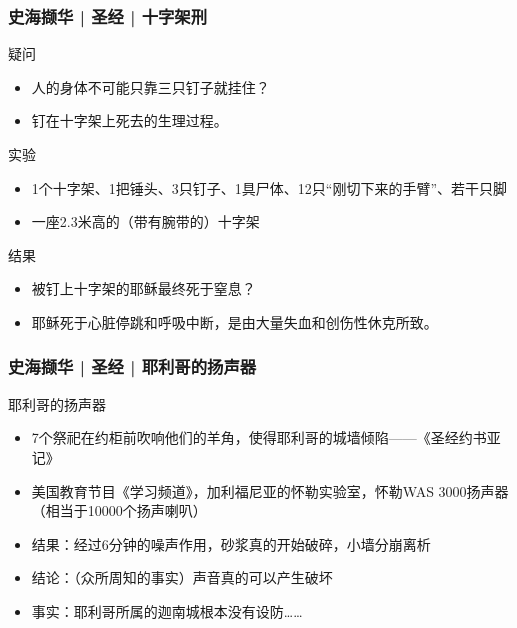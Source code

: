 \begin{frame}
  \frametitle{史海撷华 | 圣经 | 十字架刑}
  \begin{block}{疑问}
    \begin{itemize}
      \item 人的身体不可能只靠三只钉子就挂住？
      \item 钉在十字架上死去的生理过程。
    \end{itemize}
  \end{block}
  \pause
  \begin{block}{实验}
    \begin{itemize}
      \item 1个十字架、1把锤头、3只钉子、1具尸体、12只“刚切下来的手臂”、若干只脚
      \item 一座2.3米高的（带有腕带的）十字架
    \end{itemize}
  \end{block}
  \pause
  \begin{block}{结果}
    \begin{itemize}
      \item 被钉上十字架的耶稣最终死于窒息？
      \item 耶稣死于心脏停跳和呼吸中断，是由大量失血和创伤性休克所致。
    \end{itemize}
  \end{block}
\end{frame}

\begin{frame}
  \frametitle{史海撷华 | 圣经 | 耶利哥的扬声器}
  \begin{block}{耶利哥的扬声器}
    \begin{itemize}
      \item 7个祭祀在约柜前吹响他们的羊角，使得耶利哥的城墙倾陷——《圣经\textbullet 约书亚记》
      \item 美国教育节目《学习频道》，加利福尼亚的怀勒实验室，怀勒WAS 3000扬声器（相当于10000个扬声喇叭）
      \item 结果：经过6分钟的噪声作用，砂浆真的开始破碎，小墙分崩离析
      \item 结论：（众所周知的事实）声音真的可以产生破坏
      \item 事实：耶利哥所属的迦南城根本没有设防……
    \end{itemize}
  \end{block}
\end{frame}

